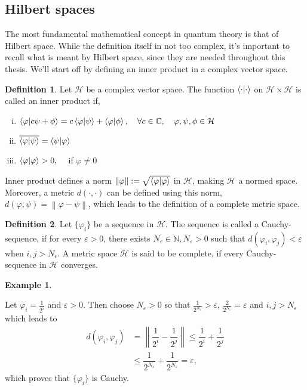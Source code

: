 \documentclass[a4paper,12pt]{wihuri}
\theoremstyle{definition}
\newtheorem{definition}{Definition}
\newtheorem{example}{Example}
\numberwithin{definition}{section}
\numberwithin{example}{section}
\numberwithin{theorem}{section}
\numberwithin{proposition}{section}
\numberwithin{lemma}{section}
\newcommand{\hi}{\mathcal{H}}%
\newcommand{\norm}[1]{\left\lVert#1\right\rVert}
\begin{document}
\subsection{Hilbert spaces}
The most fundamental mathematical concept in quantum theory is that of Hilbert space. While the definition itself in not too complex, it's important to recall what is meant by Hilbert space, since they are needed throughout this thesis. We'll start off by defining an inner product in a complex vector space.
\begin{definition}
Let $\hi$ be a complex vector space. The function $\braket{\cdot | \cdot}$ on $\hi \times \hi$ is called an inner product if,
\begin{enumerate}[i)]
\item $\braket{\varphi | c\psi + \phi} = c\braket{\varphi | \psi} + \braket{\varphi | \phi} , \quad \forall c \in \mathbb{C},\quad \varphi, \psi, \phi \in \hi$
\item $\overline{\braket{\varphi | \psi}} = \braket{\psi | \varphi}$
\item $\braket{\varphi | \varphi} > 0, \quad $ if $\varphi \neq 0$
\end{enumerate}


\end{definition}
Inner product defines a norm $\norm{\varphi} := \sqrt{\braket{\varphi | \varphi}}$  in $\hi$, making $\hi$ a normed space. Moreover, a metric $d(\cdot,\cdot)$ can be defined using this norm, $d(\varphi, \psi) = \norm{\varphi - \psi}$, which leads to the definition of a complete metric space\cite{heinosaari_ziman_2011_book}.
\begin{definition}
Let $\lbrace \varphi_i \rbrace$ be a sequence in $\hi$. The sequence is called a Cauchy-sequence, if for every $\varepsilon > 0$, there exists $N_{\varepsilon} \in \mathbb{N}, N_\varepsilon > 0$ such that $d(\varphi_i, \varphi_j) < \varepsilon$ when $i,j > N_{\epsilon}$. A metric space $\hi$ is said to be complete, if every Cauchy-sequence in $\hi$ converges. 
\end{definition}

\begin{example}

\end{example}
Let $\varphi_i = \frac{1}{2^i}$ and $\varepsilon > 0$. Then choose $N_\varepsilon > 0$ so that $\frac{1}{2^{N_\varepsilon}} > \varepsilon$, $\frac{2}{2^{N_\varepsilon}} = \varepsilon$ and $i,j > N_\varepsilon$ which leads to
\begin{align*}
d(\varphi_i, \varphi_j) &= \norm{\dfrac{1}{2^i} - \dfrac{1}{2^j}} \leq \dfrac{1}{2^i} + \dfrac{1}{2^j} \\
&\leq \dfrac{1}{2^{N_\varepsilon}} + \dfrac{1}{2^{N_\varepsilon}} = \varepsilon,
\end{align*}
which proves that $\{ \varphi_i \}$ is Cauchy.
\end{document}
